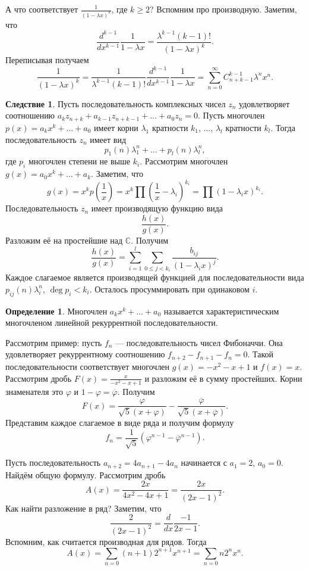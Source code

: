 \documentclass[10pt,a4paper,oneside]{book}
\theoremstyle{definition}
\newtheorem{defn}{Определение}
\newtheorem{cor}{Следствие}
\newcommand{\mb}[1]{\mathbb{#1}}
\newcommand{\ovl}{\overline}
\def\ffi{\varphi}
\def\dfn{\begin{defn}}
\def\edfn{\end{defn}}
\def\crl{\begin{cor}}
\def\ecrl{\end{cor}}
\begin{document}
А что соответствует ${\frac{1}{(1-\lambda x)^k}}$, где $k\geq 2$? Вспомним про производную. Заметим, что $$\frac{d^{k-1}}{dx^{k-1}}\frac{1}{1-\lambda x}=\frac{\lambda^{k-1} (k-1)!}{(1-\lambda x)^k}.$$
Переписывая получаем
$$\frac{1}{(1-\lambda x)^k}= \frac{1}{\lambda^{k-1} (k-1)!}\frac{d^{k-1}}{dx^{k-1}}\frac{1}{1-\lambda x}=  \sum_{n=0}^{\infty} C_{n+k-1}^{k-1} \lambda^{n}x^{n}.$$

\crl Пусть последовательность комплексных чисел $z_n$ удовлетворяет соотношению $a_k z_{n+k}+a_{k-1}z_{n+k-1}+\dots+a_0z_n=0$. Пусть многочлен $p(x)=a_k x^k+\dots +a_0$ имеет корни $\lambda_1$ кратности $k_1$, $\ldots$, $\lambda_l$ кратности $k_l$. Тогда последовательность $z_n$ имеет вид 
$$ p_1(n)\lambda_1^n+\dots+p_l(n)\lambda_l^n,$$
где $p_i$ многочлен степени не выше $k_i$.
\proof
Рассмотрим многочлен $g(x)=a_0x^k+\dots+a_k$. Заметим, что $$g(x)=x^k p\left(\frac{1}{x}\right)= x^k\prod\left(\frac{1}{x}-\lambda_i\right)^{k_i}= \prod (1-\lambda_ix)^{k_i}.$$
Последовательность $z_n$ имеет производящую функцию вида
$$\frac{h(x)}{g(x)}.$$
Разложим её на простейшие над $\mb C$. Получим 
$$\frac{h(x)}{g(x)}=\sum_{i=1}^l \sum_{0\leq j < k_i} \frac{b_{ij}}{(1-\lambda_ix)^j}.$$
Каждое слагаемое является производящей функцией для последовательности вида $p_{ij}(n)\lambda_i^n$, $\deg p_i < k_i$. Осталось просуммировать при одинаковом $i$.
\endproof
\ecrl

\dfn Многочлен $a_kx^k+\dots +a_0$ называется характеристическим многочленом линейной рекуррентной последовательности.
\edfn

Рассмотрим пример: пусть $f_n$ --- последовательность чисел Фибоначчи. Она удовлетворяет рекуррентному соотношению $f_{n+2}-f_{n+1}-f_n=0.$ Такой последовательности соответствует многочлен $g(x)=-x^2-x+1$ и $f(x)=x$. Рассмотрим дробь $F(x)=\frac{x}{-x^2-x+1}$  и разложим её в сумму простейших. Корни знаменателя это $\ffi$ и $1-\ffi=\ovl{\ffi}$. Получим 
$$F(x)= \frac{\ffi}{\sqrt{5}(x+\ffi)}-\frac{\ovl{\ffi}}{\sqrt{5}(x+\ovl{\ffi})}.$$
Представим каждое слагаемое в виде ряда и получим формулу 
$$f_n= \frac{1}{\sqrt{5}}(\ffi^{n-1}-\ovl{\ffi}^{n-1}).$$

Пусть последовательность $a_{n+2}=4a_{n+1}-4a_n$ начинается с $a_1=2$, $a_0=0$. Найдём общую формулу. Рассмотрим дробь $$A(x)=\frac{2x}{4x^2-4x+1}=\frac{2x}{(2x-1)^2}.$$ 
Как найти разложение в ряд? Заметим, что $$\frac{2}{(2x-1)^2}= \frac{d}{dx}\frac{-1}{2x-1}.$$
Вспомним, как считается производная для рядов. Тогда
$$A(x)=\sum_{n=0} (n+1) 2^{n+1} x^{n+1}=\sum_{n=0} n2^nx^n.$$
\end{document}
